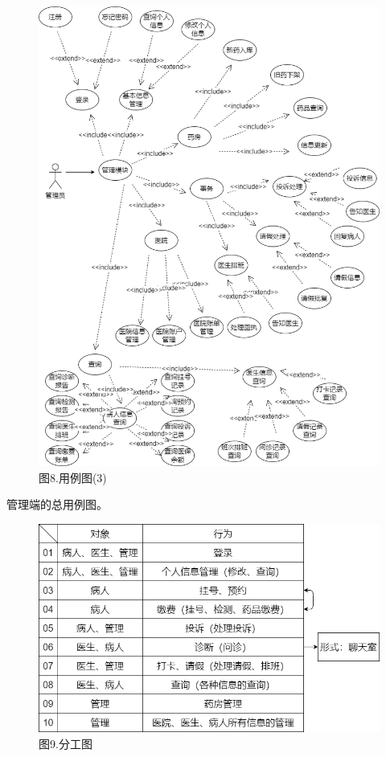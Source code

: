 \documentclass[24pt,a4paper]{article}%
\begin{document}
\begin{figure}[H]
    \centering
    \includegraphics[width=1\textwidth]{image/example3.png}
    \caption*{图8.用例图(3)}
\end{figure}
管理端的总用例图。
\begin{figure}[H]
    \centering
    \includegraphics[width=1\textwidth]{image/collaborate.png}
    \caption*{图9.分工图}
\end{figure}
\end{document}
